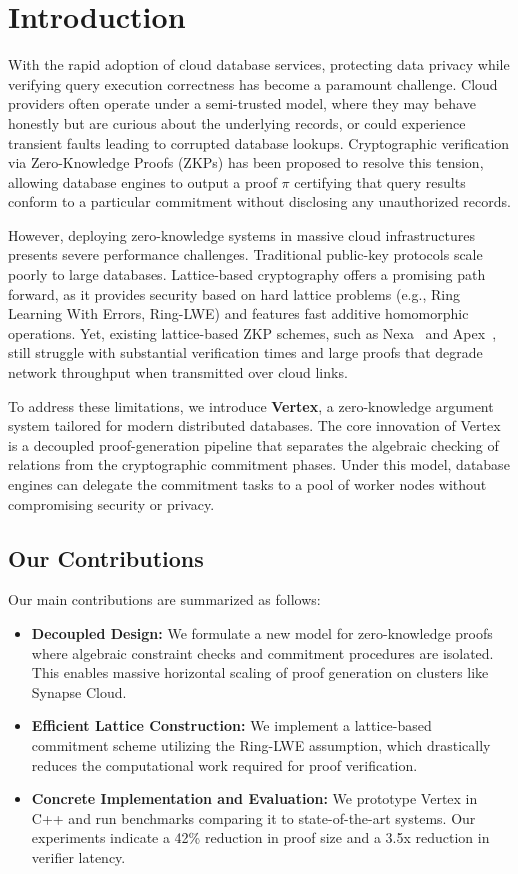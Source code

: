 \section{Introduction}
\label{sec:intro}

With the rapid adoption of cloud database services, protecting data privacy while verifying query execution correctness has become a paramount challenge. Cloud providers often operate under a semi-trusted model, where they may behave honestly but are curious about the underlying records, or could experience transient faults leading to corrupted database lookups. 
Cryptographic verification via Zero-Knowledge Proofs (ZKPs) has been proposed to resolve this tension, allowing database engines to output a proof $\pi$ certifying that query results conform to a particular commitment without disclosing any unauthorized records.

However, deploying zero-knowledge systems in massive cloud infrastructures presents severe performance challenges. Traditional public-key protocols scale poorly to large databases. Lattice-based cryptography offers a promising path forward, as it provides security based on hard lattice problems (e.g., Ring Learning With Errors, Ring-LWE) and features fast additive homomorphic operations. 
Yet, existing lattice-based ZKP schemes, such as Nexa~\cite{nexa2024lattice} and Apex~\cite{apex2025signatures}, still struggle with substantial verification times and large proofs that degrade network throughput when transmitted over cloud links.

To address these limitations, we introduce \textbf{Vertex}, a zero-knowledge argument system tailored for modern distributed databases. The core innovation of Vertex is a decoupled proof-generation pipeline that separates the algebraic checking of relations from the cryptographic commitment phases. Under this model, database engines can delegate the commitment tasks to a pool of worker nodes without compromising security or privacy.

\subsection{Our Contributions}
Our main contributions are summarized as follows:
\begin{itemize}
  \item \textbf{Decoupled Design:} We formulate a new model for zero-knowledge proofs where algebraic constraint checks and commitment procedures are isolated. This enables massive horizontal scaling of proof generation on clusters like Synapse Cloud.
  \item \textbf{Efficient Lattice Construction:} We implement a lattice-based commitment scheme utilizing the Ring-LWE assumption, which drastically reduces the computational work required for proof verification.
  \item \textbf{Concrete Implementation and Evaluation:} We prototype Vertex in C++ and run benchmarks comparing it to state-of-the-art systems. Our experiments indicate a 42\% reduction in proof size and a 3.5x reduction in verifier latency.
\end{itemize}

